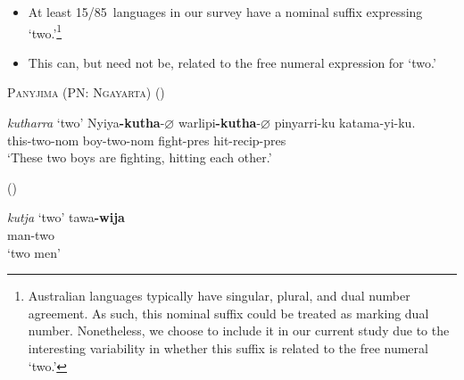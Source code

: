 \documentclass{article}
\makeatletter
\newcommand{\ofy}{/85} %
\makeatother
\begin{document}
\begin{itemize}
\item At least 15\ofy\ languages in our survey have a nominal suffix expressing `two.'\footnote{Australian languages typically have singular, plural, and dual number agreement. As such, this nominal suffix could be treated as marking dual number. Nonetheless, we choose to include it in our current study due to the interesting variability in whether this suffix is related to the free numeral `two.'}
\item This can, but need not be, related to the free numeral expression for `two.' %
\end{itemize}

\begin{exe}
  \ex \textsc{Panyjima (PN: Ngayarta)} (\citealt[121]{dench81})
  \begin{xlist}
    \ex \textit{kutharra} `two'
    \ex \gll Nyiya\textbf{-kutha}-$\varnothing$ warlipi\textbf{-kutha}-$\varnothing$ pinyarri-ku katama-yi-ku.\\
    this-two-{\sc nom} boy-two-{\sc nom} fight-{\sc pres} hit-{\sc recip}-{\sc pres}\\
    \glt `These two boys are fighting, hitting each other.'
  \end{xlist}
   (\citealt[140]{breen71}) 
  \begin{xlist}
    \ex \textit{kutja} `two'
    \ex \gll tawa\textbf{-wija}\\
    man-two\\
    \glt   `two men'
  \end{xlist}
\end{exe}
\end{document}
